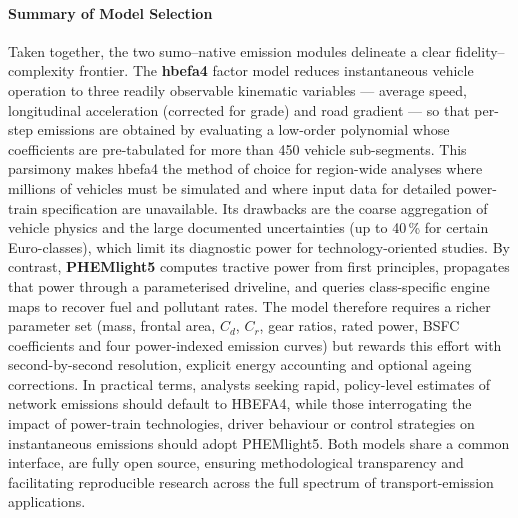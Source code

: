 \paragraph{Summary of Model Selection}  
Taken together, the two \ac{sumo}–native emission modules delineate a clear fidelity–complexity frontier.  The \textbf{\ac{hbefa}4} factor model reduces instantaneous vehicle operation to three readily observable kinematic variables --- average speed, longitudinal acceleration (corrected for grade) and road gradient --- so that per-step emissions are obtained by evaluating a low-order polynomial whose coefficients are pre-tabulated for more than 450 vehicle sub-segments.  This parsimony makes \ac{hbefa}4 the method of choice for region-wide analyses where millions of vehicles must be simulated and where input data for detailed power-train specification are unavailable. Its drawbacks are the coarse aggregation of vehicle physics and the large documented uncertainties (up to 40\,\% for certain Euro-classes), which limit its diagnostic power for technology-oriented studies.
\mynewline
By contrast, \textbf{PHEMlight5} computes tractive power from first principles, propagates that power through a parameterised driveline, and queries class-specific engine maps to recover fuel and pollutant rates. The model therefore requires a richer parameter set (mass, frontal area, $C_{d}$, $C_{r}$, gear ratios, rated power, BSFC coefficients and four power-indexed emission curves) but rewards this effort with second-by-second resolution, explicit energy accounting and optional ageing corrections. 
\mynewline
In practical terms, analysts seeking rapid, policy-level estimates of network emissions should default to HBEFA4, while those interrogating the impact of power-train technologies, driver behaviour or control strategies on instantaneous emissions should adopt PHEMlight5. Both models share a common interface, are fully open source, ensuring methodological transparency and facilitating reproducible research across the full spectrum of transport-emission applications.


